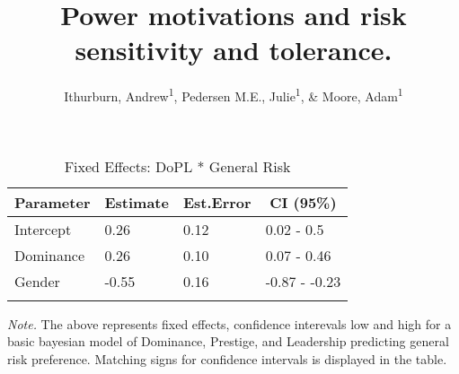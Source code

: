 \documentclass[
  donotrepeattitle,doc, 12pt, a4paper,floatsintext]{apa7}
\title{Power motivations and risk sensitivity and tolerance.}
\author{Ithurburn, Andrew\textsuperscript{1}, Pedersen M.E., Julie\textsuperscript{1}, \& Moore, Adam\textsuperscript{1}}
\date{}
\affiliation{\vspace{0.5cm}\textsuperscript{1} The University of Edinburgh}
\begin{document}
\maketitle

\begin{table}[ht]

\begin{center}
\begin{threeparttable}

\caption{\label{tab:m1-fixef-Experiment-1}Fixed Effects: DoPL * General Risk}

\begin{tabular}{llll}
\toprule
Parameter & \multicolumn{1}{c}{Estimate} & \multicolumn{1}{c}{Est.Error} & \multicolumn{1}{c}{CI (95\%)}\\
\midrule
Intercept & 0.26 & 0.12 & 0.02 - 0.5\\
Dominance & 0.26 & 0.10 & 0.07 - 0.46\\
Gender & -0.55 & 0.16 & -0.87 - -0.23\\
\bottomrule
\addlinespace
\end{tabular}

\begin{tablenotes}[para]
\normalsize{\textit{Note.} The above represents fixed effects, confidence interevals low and high for a basic bayesian model of Dominance, Prestige, and Leadership predicting general risk preference. Matching signs for confidence intervals is displayed in the table.}
\end{tablenotes}

\end{threeparttable}
\end{center}

\end{table}
\end{document}
